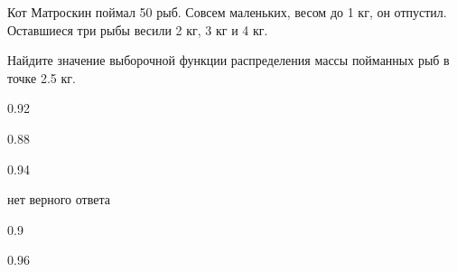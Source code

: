
\begin{question}
Кот Матроскин поймал 50 рыб. Совсем маленьких, весом до 1 кг, он
отпустил. Оставшиеся три рыбы весили 2 кг, 3 кг и 4 кг.

Найдите значение выборочной функции распределения массы пойманных рыб в
точке 2.5 кг.
\begin{answerlist}
  \item 0.92
  \item 0.88
  \item 0.94
  \item нет верного ответа
  \item 0.9
  \item 0.96
\end{answerlist}
\end{question}


